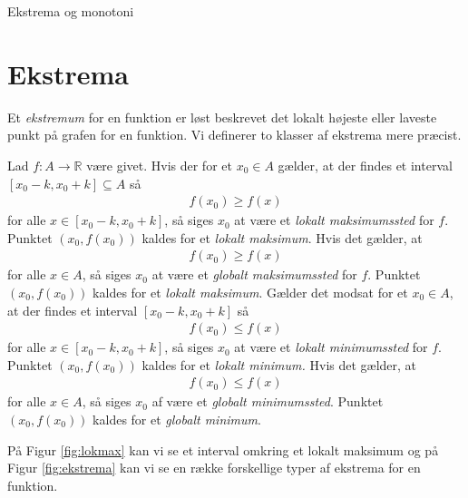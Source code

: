 \begin{center}
\Huge
	Ekstrema og monotoni
\end{center}
\section*{Ekstrema}

Et \textit{ekstremum} for en funktion er løst beskrevet det lokalt højeste eller laveste punkt på grafen for en funktion. Vi definerer to klasser af ekstrema mere præcist.
\begin{defn}[Ekstremum]
	Lad $f:A \to \mathbb{R}$ være givet. Hvis der for et $x_0 \in A$ gælder, at der findes et interval 
	$[x_0 - k,x_0 + k] \subseteq A$ så  
	\begin{align*}
		f(x_0) \geq f(x)
	\end{align*}
	for alle $x \in [x_0 - k, x_0 + k]$, så siges $x_0$ at være et \textit{lokalt maksimumssted} for $f$.
	Punktet $(x_0,f(x_0))$ kaldes for et \textit{lokalt maksimum}. Hvis det gælder, at 
	\begin{align*}
		f(x_0) \geq f(x)
	\end{align*}	
	for alle $x \in A$, så siges $x_0$ at være et \textit{globalt maksimumssted} for $f$.
	Punktet $(x_0,f(x_0))$ kaldes for et \textit{lokalt maksimum}. Gælder det modsat for et $x_0\in A$, at der
	findes et interval $[x_0 - k, x_0 + k]$ så 
	\begin{align*}
		f(x_0) \leq f(x)
	\end{align*}
	for alle $x \in [x_0 - k, x_0 + k]$, så siges $x_0$ at være et \textit{lokalt minimumssted} for $f$. 
	Punktet $(x_0,f(x_0))$ kaldes for et \textit{lokalt minimum.}
	Hvis det gælder, at 
	\begin{align*}
		f(x_0) \leq f(x)
	\end{align*}
	for alle $x \in A$, så siges $x_0$ af være et \textit{globalt minimumssted}. 
	Punktet $(x_0,f(x_0))$ kaldes for et \textit{globalt minimum}.
\end{defn}
På Figur \ref{fig:lokmax} kan vi se et interval omkring et lokalt maksimum og på Figur \ref{fig:ekstrema} kan vi se en række forskellige typer af ekstrema for en funktion.
